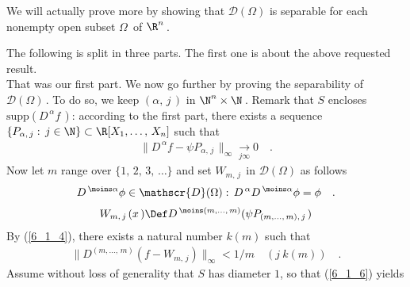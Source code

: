 We will actually prove more by showing that $\mathscr{D}(\Omega)$ is separable for each nonempty open subset $\Omega\,$ of $\R^n\,$. 

 The following is split in three parts. The first one is about the above requested result. \\


That was our first part. We now go further by proving the separability of $\mathscr{D}(\Omega)\,$. To do so, we keep $(\alpha,\, j\,)$ in $\N^n\times \N\,$. Remark that $S$ encloses $\text{supp}(D^{\, \alpha}f\,) $: according to the first part, there exists a sequence $\{ P_{\alpha,\, j}:\, j\in \N \}  \subset\R [X_1,\dotsc ,\, X_n]$ such that 
\begin{align}\label{6_1_4}
\|  D^{\, \alpha} f-  \psi P_{\alpha,\, j \,} \|_\infty \underset{j\infty}{\longrightarrow} 0 \quad . 
\end{align}
Now let $m$ range over $\{1,\, 2,\,3,\, \dots\}$ and set $W_{m,\, j\,}$ in $\mathscr{D}(\Omega)$ as follows
\begin{align}\label{6_1_5a}
D^{\,\moins \alpha} \phi \in \mathscr{D}(\Omega):\, D^{\,\alpha} D^{\,\moins \alpha} \phi= \phi\quad .
\end{align}
\begin{align}\label{6_1_5}
W_{m,\, j\,}(x\,)\Def D^{\,\moins (m,\dotsc,\,m)} ( \psi P_{(m,\dotsc, \, m),\, j\,})
                                                          \end{align}
By (\ref{6_1_4}), there exists a natural number $k(\!m)$ such that 
\begin{align}\label{6_1_6}
\|D^{(m,\dotsc,\, m)} (f   -W_{m,\, j})   \|_\infty < 1/m  \quad (j\> k(\!m) )\quad  .
\end{align}
 Assume without loss of generality that $S$ has diameter $1$, so that (\ref{6_1_6}) yields
